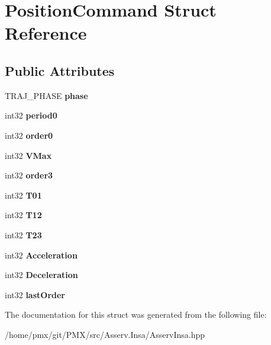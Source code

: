 \hypertarget{structPositionCommand}{}\section{Position\+Command Struct Reference}
\label{structPositionCommand}
\subsection*{Public Attributes}
\begin{DoxyCompactItemize}
\item 
\mbox{\label{structPositionCommand_ad9d68717b1ee8ccb3eb1b2e0083fffc1}} 
T\+R\+A\+J\+\_\+\+P\+H\+A\+SE {\bfseries phase}
\item 
\mbox{\label{structPositionCommand_a3e8302107de7d57977348d9a7909f83a}} 
int32 {\bfseries period0}
\item 
\mbox{\label{structPositionCommand_ab129ddd9246bd3b34c1eb25953fa55cb}} 
int32 {\bfseries order0}
\item 
\mbox{\label{structPositionCommand_a0666309ffc6f6391f4d6b51840ab14bd}} 
int32 {\bfseries V\+Max}
\item 
\mbox{\label{structPositionCommand_a7ea9211a15d2f46e8f9da8b991a314ba}} 
int32 {\bfseries order3}
\item 
\mbox{\label{structPositionCommand_a0417afcbb17f7e70206786a5386a6a63}} 
int32 {\bfseries T01}
\item 
\mbox{\label{structPositionCommand_a5b49d6338b2a25b2eb8906a10a6ca413}} 
int32 {\bfseries T12}
\item 
\mbox{\label{structPositionCommand_ac30b91860c7c4e235aefbf2d2b1b0114}} 
int32 {\bfseries T23}
\item 
\mbox{\label{structPositionCommand_a364b2f85939c31261ca93e1879f4b5cb}} 
int32 {\bfseries Acceleration}
\item 
\mbox{\label{structPositionCommand_a7bb72e231df94b917e1bc1f74f4b6edc}} 
int32 {\bfseries Deceleration}
\item 
\mbox{\label{structPositionCommand_aad10e70ce753984d836bc8cde414fe04}} 
int32 {\bfseries last\+Order}
\end{DoxyCompactItemize}


The documentation for this struct was generated from the following file\+:\begin{DoxyCompactItemize}
\item 
/home/pmx/git/\+P\+M\+X/src/\+Asserv.\+Insa/Asserv\+Insa.\+hpp\end{DoxyCompactItemize}
